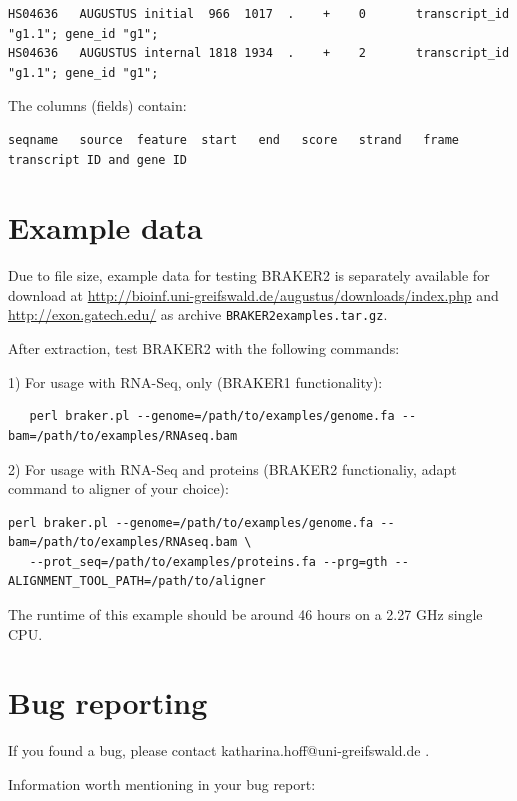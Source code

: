 \documentclass[a4paper,10pt]{report}
\begin{document}
\begin{verbatim}
HS04636   AUGUSTUS initial  966  1017  .    +    0       transcript_id "g1.1"; gene_id "g1";
HS04636   AUGUSTUS internal 1818 1934  .    +    2       transcript_id "g1.1"; gene_id "g1";
\end{verbatim}

The columns (fields) contain: 

\begin{verbatim}
seqname   source  feature  start   end   score   strand   frame  transcript ID and gene ID
\end{verbatim}


\chapter{Example data}


Due to file size, example data for testing BRAKER2 is separately available for download at 
\url{http://bioinf.uni-greifswald.de/augustus/downloads/index.php} and \url{http://exon.gatech.edu/} as archive
\texttt{BRAKER2examples.tar.gz}.

After extraction, test BRAKER2 with the following commands:

1) For usage with RNA-Seq, only (BRAKER1 functionality):

\begin{verbatim}
   perl braker.pl --genome=/path/to/examples/genome.fa --bam=/path/to/examples/RNAseq.bam
\end{verbatim}

2) For usage with RNA-Seq and proteins (BRAKER2 functionaliy, adapt command to aligner of your 
   choice):
   
   
\begin{verbatim}
perl braker.pl --genome=/path/to/examples/genome.fa --bam=/path/to/examples/RNAseq.bam \
   --prot_seq=/path/to/examples/proteins.fa --prg=gth --ALIGNMENT_TOOL_PATH=/path/to/aligner
\end{verbatim}
   
The runtime of this example should be around 46 hours on a 2.27 GHz single CPU.

\chapter{Bug reporting}


If you found a bug, please contact katharina.hoff@uni-greifswald.de .

Information worth mentioning in your bug report:
\end{document}
